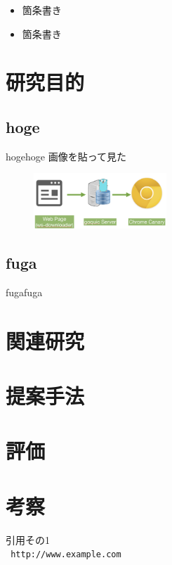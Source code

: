 \documentclass[a4j,10pt]{jsarticle}
\begin{document}
\begin{itemize}
\item 箇条書き
\item 箇条書き
\end{itemize}


\section{研究目的}

\subsection{hoge}
hogehoge
画像を貼って見た

\begin{figure}[htbp]
    \includegraphics[width=5cm]{figure1.png}
    \caption{}
\end{figure}
 
\subsection{fuga}
fugafuga

\section{関連研究}

\section{提案手法}

\section{評価}

\section{考察}

\begin{thebibliography}{99}
引用その1\\
\texttt{ http://www.example.com}
\end{thebibliography}
\end{document}
